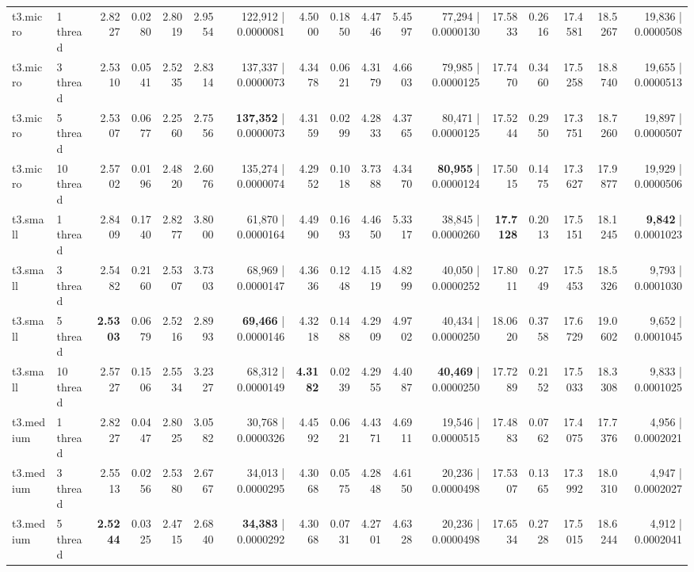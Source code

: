 \documentclass[conference]{IEEEtran}
\begin{document}
\begin{table}[h]
{\begin{tabular}{ll|rrrrr|rrrrr|rrrrr}
				\midrule
				t3.micro & 1 thread & 2.8227 & 0.0280 & 2.8019 & 2.9554 & 122,912 | 0.0000081 & 4.5000 & 0.1850 & 4.4746 & 5.4597 & 77,294 | 0.0000130 & 17.5833 & 0.2616 & 17.4581 & 18.5267 & 19,836 | 0.0000508 \\
				t3.micro & 3 thread & 2.5310 & 0.0541 & 2.5235 & 2.8314 & 137,337 | 0.0000073 & 4.3478 & 0.0621 & 4.3179 & 4.6603 & 79,985 | 0.0000125 & 17.7470 & 0.3460 & 17.5258 & 18.8740 & 19,655 | 0.0000513 \\
				t3.micro & 5 thread & 2.5307 & 0.0677 & 2.2560 & 2.7556 & \textbf{137,352} | 0.0000073 & 4.3159 & 0.0299 & 4.2833 & 4.3765 & 80,471 | 0.0000125 & 17.5244 & 0.2950 & 17.3751 & 18.7260 & 19,897 | 0.0000507 \\
				t3.micro & 10 thread & 2.5702 & 0.0196 & 2.4820 & 2.6076 & 135,274 | 0.0000074 & 4.2952 & 0.1018 & 3.7388 & 4.3470 & \textbf{80,955} | 0.0000124 & 17.5015 & 0.1475 & 17.3627 & 17.9877 & 19,929 | 0.0000506 \\
				\midrule
				t3.small & 1 thread & 2.8409 & 0.1740 & 2.8277 & 3.8000 & 61,870 | 0.0000164 & 4.4990 & 0.1693 & 4.4650 & 5.3317 & 38,845 | 0.0000260 & \textbf{17.7128} & 0.2013 & 17.5151 & 18.1245 & \textbf{9,842} | 0.0001023 \\
				t3.small & 3 thread & 2.5482 & 0.2160 & 2.5307 & 3.7303 & 68,969 | 0.0000147 & 4.3636 & 0.1248 & 4.1519 & 4.8299 & 40,050 | 0.0000252 & 17.8011 & 0.2749 & 17.5453 & 18.5326 & 9,793 | 0.0001030 \\
				t3.small & 5 thread & \textbf{2.5303} & 0.0679 & 2.5216 & 2.8993 & \textbf{69,466} | 0.0000146 & 4.3218 & 0.1488 & 4.2909 & 4.9702 & 40,434 | 0.0000250 & 18.0620 & 0.3758 & 17.6729 & 19.0602 & 9,652 | 0.0001045 \\
				t3.small & 10 thread & 2.5727 & 0.1506 & 2.5534 & 3.2327 & 68,312 | 0.0000149 & \textbf{4.3182} & 0.0239 & 4.2955 & 4.4087 & \textbf{40,469} | 0.0000250 & 17.7289 & 0.2152 & 17.5033 & 18.3308 & 9,833 | 0.0001025 \\
				\midrule
				t3.medium & 1 thread & 2.8227 & 0.0447 & 2.8025 & 3.0582 & 30,768 | 0.0000326 & 4.4592 & 0.0621 & 4.4371 & 4.6911 & 19,546 | 0.0000515 & 17.4883 & 0.0762 & 17.4075 & 17.7376 & 4,956 | 0.0002021 \\
				t3.medium & 3 thread & 2.5513 & 0.0256 & 2.5380 & 2.6767 & 34,013 | 0.0000295 & 4.3068 & 0.0575 & 4.2848 & 4.6150 & 20,236 | 0.0000498 & 17.5307 & 0.1365 & 17.3992 & 18.0310 & 4,947 | 0.0002027 \\
				t3.medium & 5 thread & \textbf{2.5244} & 0.0325 & 2.4715 & 2.6840 & \textbf{34,383} | 0.0000292 & 4.3068 & 0.0731 & 4.2701 & 4.6328 & 20,236 | 0.0000498 & 17.6534 & 0.2728 & 17.5015 & 18.6244 & 4,912 | 0.0002041 \\

\end{tabular}}
\end{table}
\end{document}

